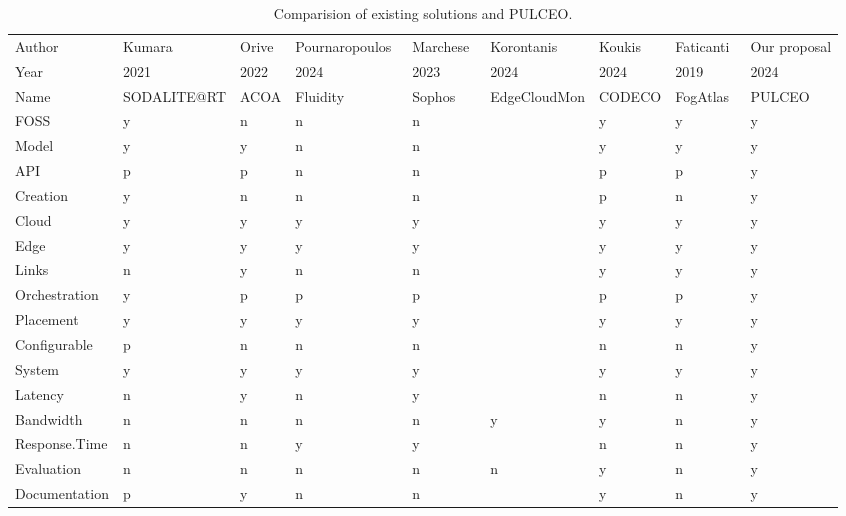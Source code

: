 \begin{table*}[b]

\caption{\label{tab:comparison-of-existing-solutions-and-pulceo}Comparision of existing solutions and PULCEO.}
\centering
\begin{tabu} to 
\toprule
Author & Kumara~\cite{kumaraSODALITERTOrchestrating2021} & Orive~\cite{oriveQualityServiceAware2022} & Pournaropoulos~\cite{pournaropoulosFluidityProvidingFlexible2024} & Marchese~\cite{marcheseSophosFrameworkApplication2023} & Korontanis~\cite{korontanisEdgeCloudMonLightweight2024} & Koukis~\cite{koukisOpenSourceExperimentationFramework2024} & Faticanti~\cite{faticantiCuttingThroughputEdge2019} & Our proposal\\
Year & 2021 & 2022 & 2024 & 2023 & 2024 & 2024 & 2019 & 2024\\
Name & SODALITE@RT & ACOA & Fluidity & Sophos & EdgeCloudMon & CODECO & FogAtlas & PULCEO\\
FOSS & y & n & n & n &  & y & y & y\\
Model & y & y & n & n &  & y & y & y\\
API & p & p & n & n &  & p & p & y\\
Creation & y & n & n & n &  & p & n & y\\
Cloud & y & y & y & y &  & y & y & y\\
Edge & y & y & y & y &  & y & y & y\\
Links & n & y & n & n &  & y & y & y\\
Orchestration & y & p & p & p &  & p & p & y\\
Placement & y & y & y & y &  & y & y & y\\
Configurable & p & n & n & n &  & n & n & y\\
System & y & y & y & y &  & y & y & y\\
Latency & n & y & n & y &  & n & n & y\\
Bandwidth & n & n & n & n & y & y & n & y\\
Response.Time & n & n & y & y &  & n & n & y\\
Evaluation & n & n & n & n & n & y & n & y\\
Documentation & p & y & n & n &  & y & n & y\\
\bottomrule
\end{tabu}
\end{table*}
